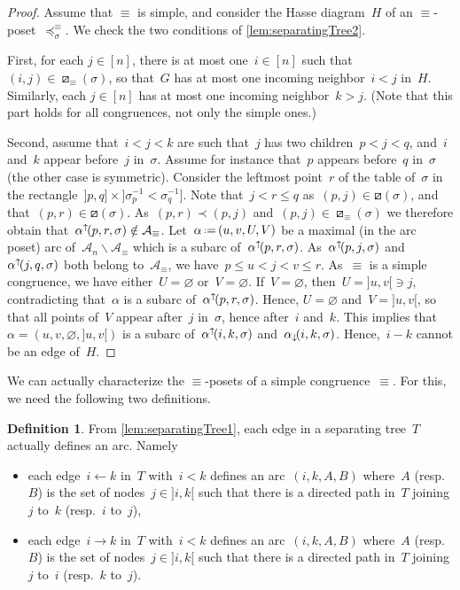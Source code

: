 \documentclass{amsart}
\theoremstyle{definition}
\newtheorem{definition}[theorem]{Definition}
\newcommand{\ssm}{\smallsetminus} %
\newcommand{\eqdef}{\mbox{\,\raisebox{0.2ex}{\scriptsize\ensuremath{\mathrm:}}\ensuremath{=}\,}} %
\newcommand{\arcs}{{\mathcal{A}}} %
\newcommand{\arcDown}{\smash{\alpha_{\downarrow\!}}} %
\newcommand{\arcUp}{\smash{\alpha^{\uparrow\!}}} %
\begin{document}
\begin{proof}
Assume that $\equiv$ is simple, and consider the Hasse diagram~$H$ of an $\equiv$-poset~$\preccurlyeq^\equiv_\sigma$.
We check the two conditions of \cref{lem:separatingTree2}.

First, for each $j \in [n]$, there is at most one~$i \in [n]$ such that~$(i,j) \in \boxslash_\equiv(\sigma)$, so that~$G$ has at most one incoming neighbor~$i < j$ in~$H$.
Similarly, each $j \in [n]$ has at most one incoming neighbor~$k > j$.
(Note that this part holds for all congruences, not only the simple ones.)

Second, assume that~$i < j < k$ are such that~$j$ has two children~$p < j < q$, and~$i$ and~$k$ appear before~$j$ in~$\sigma$.
Assume for instance that~$p$ appears before~$q$ in~$\sigma$ (the other case is symmetric).
Consider the leftmost point~$r$ of the table of~$\sigma$ in the rectangle~${]p, q]} \times {]\sigma^{-1}_p < \sigma^{-1}_q]}$.
Note that~${j < r \le q}$ as~$(p,j) \in \boxslash(\sigma)$, and that~$(p,r) \in \boxslash(\sigma)$.
As~$(p, r) \prec (p, j)$ and~$(p, j) \in \boxslash_\equiv(\sigma)$ we therefore obtain that~$\arcUp(p, r, \sigma) \notin \arcs_\equiv$.
Let~$\alpha \eqdef (u, v, U, V)$ be a maximal (in the arc poset) arc of~$\arcs_n \ssm \arcs_\equiv$ which is a subarc of~$\arcUp(p, r, \sigma)$.
As~$\arcUp(p, j, \sigma)$ and~$\arcUp(j, q, \sigma)$ both belong to~$\arcs_\equiv$, we have~$p \le u < j < v \le r$.
As~$\equiv$ is a simple congruence, we have either~$U = \varnothing$ or~$V = \varnothing$.
If~$V = \varnothing$, then~$U = {]u,v[} \ni j$, contradicting that~$\alpha$ is a subarc of~$\arcUp(p, r, \sigma)$.
Hence, $U = \varnothing$ and~$V = {]u,v[}$, so that all points of~$V$ appear after~$j$ in~$\sigma$, hence after~$i$ and~$k$.
This implies that~$\alpha = (u, v, \varnothing, {]u,v[})$ is a subarc of~$\arcUp(i, k, \sigma)$ and~$\arcDown(i, k, \sigma)$.
Hence,~$i-k$ cannot be an edge of~$H$.
\end{proof}

We can actually characterize the $\equiv$-posets of a simple congruence~$\equiv$.
For this, we need the following two definitions.

\begin{definition}
\label{lem:edgeIsArc}
From \cref{lem:separatingTree1}, each edge in a separating tree~$T$ actually defines an arc. Namely
\begin{itemize}
\item each edge~$i \leftarrow k$ in~$T$ with~$i < k$ defines an arc~$(i, k, A, B)$ where~$A$ (resp.~$B$) is the set of nodes~$j \in {]i,k[}$ such that there is a directed path in~$T$ joining $j$ to~$k$ (resp.~$i$ to~$j$),
\item each edge~$i \to k$ in~$T$ with~$i < k$ defines an arc~$(i, k, A, B)$ where~$A$ (resp.~$B$) is the set of nodes~$j \in {]i,k[}$ such that there is a directed path in~$T$ joining $j$ to~$i$ (resp.~$k$ to~$j$).
\end{itemize}
\end{definition}
\end{document}
